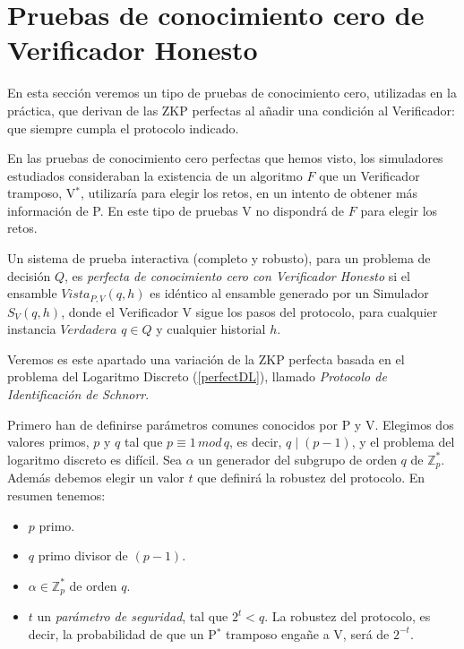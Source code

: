 \hfil




\section{Pruebas de conocimiento cero de Verificador Honesto}\label{honestVer:sec}



En esta sección veremos un tipo de pruebas de conocimiento cero, utilizadas en la práctica, que derivan de las ZKP perfectas al añadir una condición al Verificador: que siempre cumpla el protocolo indicado.

En las pruebas de conocimiento cero perfectas que hemos visto, los simuladores estudiados consideraban la existencia de un algoritmo $F$ que un Verificador tramposo, V$^*$, utilizaría para elegir los retos, en un intento de obtener más información de P. En este tipo de pruebas V no dispondrá de $F$ para elegir los retos.


\begin{definition}
	\hfil
	
	Un sistema de prueba interactiva (completo y robusto), para un problema de decisión $Q$, es \textit{perfecta de conocimiento cero con Verificador Honesto} si el ensamble $Vista_{P,V}(q,h)$ es idéntico al ensamble generado por un Simulador $S_{V}(q,h)$, donde el Verificador V sigue los pasos del protocolo, para cualquier instancia $Verdadera$ $q\in Q$ y cualquier historial $h$.
\end{definition}

\hfil

Veremos es este apartado una variación de la ZKP perfecta basada en el problema del Logaritmo Discreto (\ref{perfectDL}), llamado \textit{Protocolo de Identificación de Schnorr}.

Primero han de definirse parámetros comunes conocidos por P y V. Elegimos dos valores primos, $p$ y $q$ tal que $p\equiv 1 \, mod \, q$, es decir, $q\mid (p-1)$, y el problema del logaritmo discreto es difícil. Sea $\alpha$ un generador del subgrupo de orden $q$ de $\mathbb{Z}_p^*$. Además debemos elegir un valor $t$ que definirá la robustez del protocolo. En resumen tenemos:

\begin{itemize}
	\item $p$ primo.
	\item $q$ primo divisor de $(p-1)$.
	\item $\alpha \in \mathbb{Z}_p^*$ de orden $q$.
	\item $t$ un \textit{parámetro de seguridad}, tal que $2^t < q$. La robustez del protocolo, es decir, la probabilidad de que un P$^*$ tramposo engañe a V, será de $2^{-t}$.
\end{itemize}


